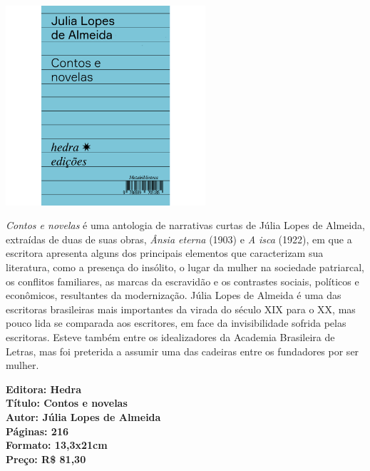 \pagebreak

\begin{center}
\hspace*{.5cm}\includegraphics[width=74mm]{./grid/almeida.png}
\end{center}

\hspace*{-7cm}\hrulefill\hspace*{-7cm}

\medskip

\noindent{}\textit{Contos e novelas} é uma antologia de narrativas curtas de Júlia Lopes de Almeida, extraídas de duas de suas obras, \textit{Ânsia eterna} (1903) e \textit{A isca} (1922), em que a escritora apresenta alguns dos principais elementos que caracterizam sua literatura, como a presença do insólito, o lugar da mulher na sociedade patriarcal, os conflitos familiares, as marcas da escravidão e os contrastes sociais, políticos e econômicos, resultantes da modernização. Júlia Lopes de Almeida é uma das escritoras brasileiras mais importantes da virada do século XIX para o XX, mas pouco lida se comparada aos escritores, em face da invisibilidade sofrida pelas escritoras. Esteve também entre os idealizadores da Academia Brasileira de Letras, mas foi preterida a assumir uma das cadeiras entre os fundadores por ser mulher.
\vfill

\noindent\begin{minipage}[c]{.5\linewidth}
{\small\textbf{
\hspace*{-.1cm}Editora: Hedra\\
Título: Contos e novelas\\
Autor: Júlia Lopes de Almeida\\ 
Páginas: 216\\
Formato: 13,3x21cm\\
Preço: R\$ 81,30\\
}}
\end{minipage}

